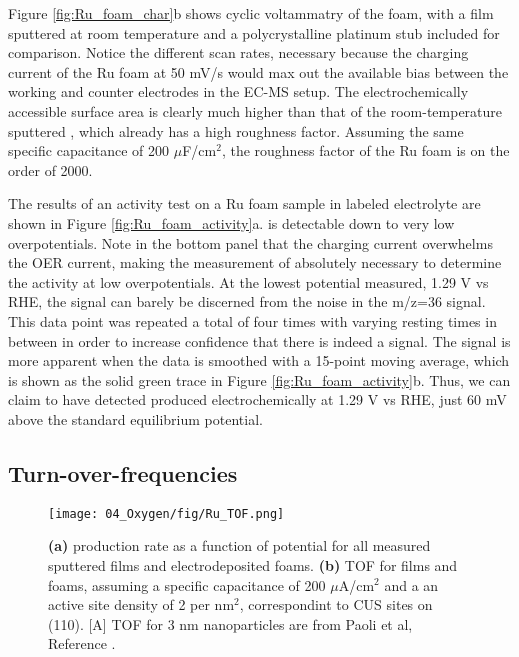 Figure \ref{fig:Ru_foam_char}b shows cyclic voltammatry of the  foam, with a  film sputtered at room temperature and a polycrystalline platinum stub included for comparison. Notice the different scan rates, necessary because the charging current of the Ru foam at 50 mV/s would max out the available bias between the working and counter electrodes in the EC-MS setup. The electrochemically accessible surface area is clearly much higher than that of the room-temperature sputtered , which already has a high roughness factor. Assuming the same specific capacitance of 200 $\mu$F/cm$^{2}$\cite{Yoshida2013}, the roughness factor of the Ru foam is on the order of 2000.

The results of an activity test on a Ru foam sample in labeled electrolyte are shown in Figure \ref{fig:Ru_foam_activity}a.  is detectable down to very low overpotentials. Note in the bottom panel that the charging current overwhelms the OER current, making the measurement of  absolutely necessary to determine the activity at low overpotentials. At the lowest potential measured, 1.29 V vs RHE, the signal can barely be discerned from the noise in the m/z=36 signal. This data point was repeated a total of four times with varying resting times in between in order to increase confidence that there is indeed a signal. The signal is more apparent when the data is smoothed with a 15-point moving average, which is shown as the solid green trace in Figure \ref{fig:Ru_foam_activity}b. Thus, we can claim to have detected  produced electrochemically at 1.29 V vs RHE, just 60 mV above the standard equilibrium potential.


\subsection{Turn-over-frequencies}\label{subsec:TOF}

\begin{figure}[b!]
	\centering
	\texttt{[image: 04\_Oxygen/fig/Ru\_TOF.png]}
	\caption{\textbf{(a)}  production rate as a function of potential for all measured sputtered  films and electrodeposited  foams. \textbf{(b)} TOF for films and foams, assuming a specific capacitance of 200 $\mu$A/cm$^2$ and a an active site density of 2 per nm$^2$, correspondint to CUS sites on (110)\cite{Rao2017a}. [A] TOF for 3 nm  nanoparticles are from Paoli et al, Reference .}
	\label{fig:Ru_TOF}
\end{figure}

